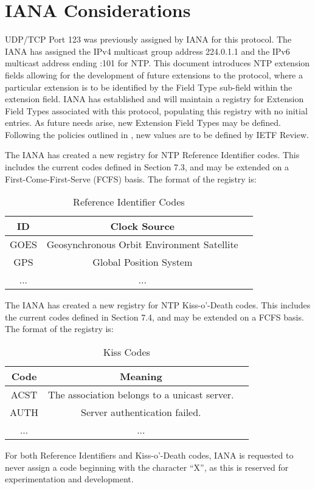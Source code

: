 \chapter{IANA Considerations}

UDP/TCP Port 123 was previously assigned by IANA for this protocol.
The IANA has assigned the IPv4 multicast group address 224.0.1.1 and
the IPv6 multicast address ending :101 for NTP.  This document
introduces NTP extension fields allowing for the development of
future extensions to the protocol, where a particular extension is to
be identified by the Field Type sub-field within the extension field.
IANA has established and will maintain a registry for Extension Field
Types associated with this protocol, populating this registry with no
initial entries.  As future needs arise, new Extension Field Types
may be defined.  Following the policies outlined in \cite{RFC5226}, new
values are to be defined by IETF Review.

The IANA has created a new registry for NTP Reference Identifier
codes.  This includes the current codes defined in Section 7.3, and
may be extended on a First-Come-First-Serve (FCFS) basis.  The format
of the registry is:

\begin{table}[htb]
\center
\begin{tabular}{c | c | c}
ID   & Clock Source \\
\hline
\hline
GOES & Geosynchronous Orbit Environment Satellite \\
GPS  & Global Position System                     \\
...  & ...                                        \\
\hline
\end{tabular}
\label{reference_identifier_codes}
\caption{Reference Identifier Codes}
\end{table}

The IANA has created a new registry for NTP Kiss-o'-Death codes.
This includes the current codes defined in Section 7.4, and may be
extended on a FCFS basis.  The format of the registry is:

\begin{table}[htb]
\center
\begin{tabular}{c | c | c}
Code & Meaning \\
\hline
\hline
ACST & The association belongs to a unicast server. \\
AUTH & Server authentication failed. \\
...  & ... \\
\hline
\end{tabular}
\label{kiss_codes}
\caption{Kiss Codes}
\end{table}

For both Reference Identifiers and Kiss-o'-Death codes, IANA is
requested to never assign a code beginning with the character ``X'', as
this is reserved for experimentation and development.
